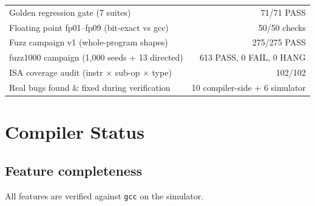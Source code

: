 \documentclass[11pt,a4paper]{report}
\begin{document}
\begin{center}
\begin{tabular}{@{}lr@{}}
\toprule
Golden regression gate (7 suites) & 71/71 PASS \\
Floating point fp01--fp09 (bit-exact vs gcc) & 50/50 checks \\
Fuzz campaign v1 (whole-program shapes) & 275/275 PASS \\
fuzz1000 campaign (1{,}000 seeds + 13 directed) & 613 PASS, 0 FAIL, 0 HANG \\
ISA coverage audit (instr $\times$ sub-op $\times$ type) & 102/102 \\
Real bugs found \& fixed during verification & 10 compiler-side + 6 simulator \\
\bottomrule
\end{tabular}
\end{center}

\chapter{Compiler Status}

\section{Feature completeness}

All features are verified against \texttt{gcc} on the simulator.
\end{document}
